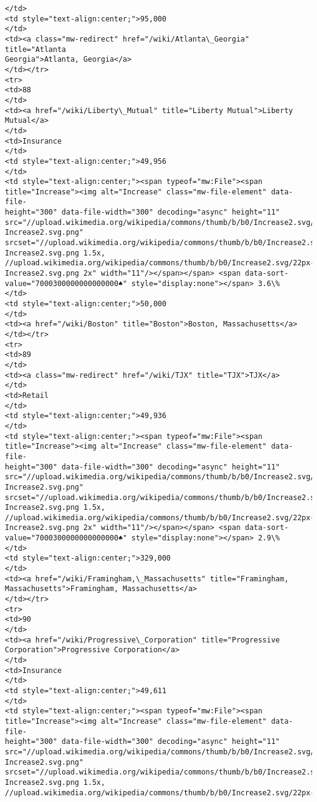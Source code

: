 \documentclass[11pt]{article}
\begin{document}
\begin{Verbatim}[commandchars=\\\{\}]
</td>
<td style="text-align:center;">95,000
</td>
<td><a class="mw-redirect" href="/wiki/Atlanta\_Georgia" title="Atlanta
Georgia">Atlanta, Georgia</a>
</td></tr>
<tr>
<td>88
</td>
<td><a href="/wiki/Liberty\_Mutual" title="Liberty Mutual">Liberty Mutual</a>
</td>
<td>Insurance
</td>
<td style="text-align:center;">49,956
</td>
<td style="text-align:center;"><span typeof="mw:File"><span
title="Increase"><img alt="Increase" class="mw-file-element" data-file-
height="300" data-file-width="300" decoding="async" height="11"
src="//upload.wikimedia.org/wikipedia/commons/thumb/b/b0/Increase2.svg/11px-
Increase2.svg.png"
srcset="//upload.wikimedia.org/wikipedia/commons/thumb/b/b0/Increase2.svg/17px-
Increase2.svg.png 1.5x,
//upload.wikimedia.org/wikipedia/commons/thumb/b/b0/Increase2.svg/22px-
Increase2.svg.png 2x" width="11"/></span></span> <span data-sort-
value="7000300000000000000♠" style="display:none"></span> 3.6\%
</td>
<td style="text-align:center;">50,000
</td>
<td><a href="/wiki/Boston" title="Boston">Boston, Massachusetts</a>
</td></tr>
<tr>
<td>89
</td>
<td><a class="mw-redirect" href="/wiki/TJX" title="TJX">TJX</a>
</td>
<td>Retail
</td>
<td style="text-align:center;">49,936
</td>
<td style="text-align:center;"><span typeof="mw:File"><span
title="Increase"><img alt="Increase" class="mw-file-element" data-file-
height="300" data-file-width="300" decoding="async" height="11"
src="//upload.wikimedia.org/wikipedia/commons/thumb/b/b0/Increase2.svg/11px-
Increase2.svg.png"
srcset="//upload.wikimedia.org/wikipedia/commons/thumb/b/b0/Increase2.svg/17px-
Increase2.svg.png 1.5x,
//upload.wikimedia.org/wikipedia/commons/thumb/b/b0/Increase2.svg/22px-
Increase2.svg.png 2x" width="11"/></span></span> <span data-sort-
value="7000300000000000000♠" style="display:none"></span> 2.9\%
</td>
<td style="text-align:center;">329,000
</td>
<td><a href="/wiki/Framingham,\_Massachusetts" title="Framingham,
Massachusetts">Framingham, Massachusetts</a>
</td></tr>
<tr>
<td>90
</td>
<td><a href="/wiki/Progressive\_Corporation" title="Progressive
Corporation">Progressive Corporation</a>
</td>
<td>Insurance
</td>
<td style="text-align:center;">49,611
</td>
<td style="text-align:center;"><span typeof="mw:File"><span
title="Increase"><img alt="Increase" class="mw-file-element" data-file-
height="300" data-file-width="300" decoding="async" height="11"
src="//upload.wikimedia.org/wikipedia/commons/thumb/b/b0/Increase2.svg/11px-
Increase2.svg.png"
srcset="//upload.wikimedia.org/wikipedia/commons/thumb/b/b0/Increase2.svg/17px-
Increase2.svg.png 1.5x,
//upload.wikimedia.org/wikipedia/commons/thumb/b/b0/Increase2.svg/22px-

\end{Verbatim}
\end{document}

